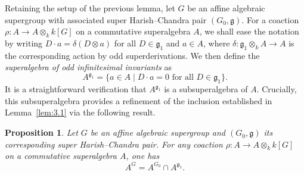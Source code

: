 \documentclass[11pt,a4paper,reqno,noamsfonts]{amsart}
\numberwithin{equation}{section}
\newtheorem{proposition}[theorem]{Proposition}
\theoremstyle{definition}
\theoremstyle{remark}
\newcommand{\gfrak}{\ensuremath{\mathfrak{g}}}
\begin{document}
Retaining the setup of the previous lemma, let $G$ be an affine algebraic supergroup with associated super Harish--Chandra pair $(G_0, \mathfrak{g})$. For a coaction $\rho \colon A \to A \otimes_k k[G]$ on a commutative superalgebra $A$, we shall ease the notation by writing $D \cdot a = \delta(D \otimes a)$ for all $D \in \mathfrak{g}_1$ and $a \in A$, where $\delta \colon \gfrak_1 \otimes_k A \to A$ is the corresponding action by odd superderivations. We then define the \emph{superalgebra of odd infinitesimal invariants} as
\begin{equation}\label{eq:3.7}
A^{\gfrak_1} = \{ a \in A \mid \text{$D \cdot a = 0$ for all $D \in \gfrak_1$}\}.
\end{equation}
It is a straightforward verification that $A^{\gfrak_{1}}$ is a subsuperalgebra of $A$. Crucially, this subsuperalgebra provides a refinement of the inclusion established in Lemma~\ref{lem:3.1} via the following result.

\begin{proposition}\label{prop:3.4}
Let $G$ be an affine algebraic supergroup and $(G_0, \mathfrak{g})$ its corresponding super Harish--Chandra pair. For any coaction $\rho \colon A \to A \otimes_k k[G]$ on a commutative superalgebra $A$, one has 
\begin{equation}
A^{G}  = A^{G_0} \cap A^{\gfrak_1}. 
\end{equation}
\end{proposition}
\end{document}
